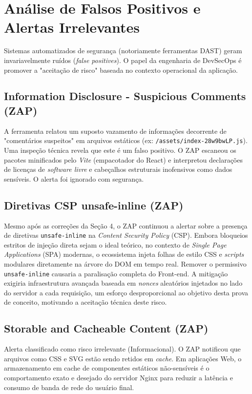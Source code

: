 \documentclass[12pt, a4paper]{article}
\begin{document}
\section{Análise de Falsos Positivos e Alertas Irrelevantes}

Sistemas automatizados de segurança (notoriamente ferramentas DAST) geram invariavelmente ruídos (\textit{false positives}). O papel da engenharia de DevSecOps é promover a "aceitação de risco" baseada no contexto operacional da aplicação.

\subsection{Information Disclosure - Suspicious Comments (ZAP)}
A ferramenta relatou um suposto vazamento de informações decorrente de "comentários suspeitos" em arquivos estáticos (ex: \texttt{/assets/index-28w9bwLP.js}). Uma inspeção técnica revela que este é um falso positivo. O ZAP escaneou os pacotes minificados pelo \textit{Vite} (empacotador do React) e interpretou declarações de licenças de \textit{software livre} e cabeçalhos estruturais inofensivos como dados sensíveis. O alerta foi ignorado com segurança.

\subsection{Diretivas CSP unsafe-inline (ZAP)}
Mesmo após as correções da Seção 4, o ZAP continuou a alertar sobre a presença de diretivas \texttt{unsafe-inline} na \textit{Content Security Policy} (CSP). Embora bloqueios estritos de injeção direta sejam o ideal teórico, no contexto de \textit{Single Page Applications} (SPA) modernas, o ecossistema injeta folhas de estilo CSS e \textit{scripts} modulares diretamente na árvore do DOM em tempo real. Remover o permissivo \texttt{unsafe-inline} causaria a paralisação completa do Front-end. A mitigação exigiria infraestrutura avançada baseada em \textit{nonces} aleatórios injetados no lado do servidor a cada requisição, um esforço desproporcional ao objetivo desta prova de conceito, motivando a aceitação técnica deste risco.

\subsection{Storable and Cacheable Content (ZAP)}
Alerta classificado como risco irrelevante (Informacional). O ZAP notificou que arquivos como CSS e SVG estão sendo retidos em \textit{cache}. Em aplicações Web, o armazenamento em cache de componentes estáticos não-sensíveis é o comportamento exato e desejado do servidor Nginx para reduzir a latência e consumo de banda de rede do usuário final.
\end{document}

